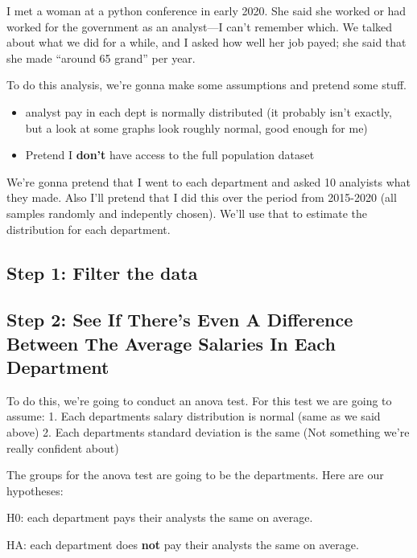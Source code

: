 \documentclass[letterpaper]{article}
\theoremstyle{definition}
\begin{document}
I met a woman at a python conference in early 2020. She said she worked
or had worked for the government as an analyst---I can't remember which.
We talked about what we did for a while, and I asked how well her job
payed; she said that she made ``around 65 grand'' per year.

To do this analysis, we're gonna make some assumptions and pretend some
stuff.

\begin{itemize}
\item
  analyst pay in each dept is normally distributed (it probably isn't
  exactly, but a look at some graphs look roughly normal, good enough
  for me)
\item
  Pretend I \textbf{don't} have access to the full population dataset
\end{itemize}

We're gonna pretend that I went to each department and asked 10
analyists what they made. Also I'll pretend that I did this over the
period from 2015-2020 (all samples randomly and indepently chosen).
We'll use that to estimate the distribution for each department.

    \hypertarget{step-1-filter-the-data}{%
\subsection{Step 1: Filter the data}\label{step-1-filter-the-data}}

    

    \hypertarget{step-2-see-if-theres-even-a-difference-between-the-average-salaries-in-each-department}{%
\subsection{Step 2: See If There's Even A Difference Between The Average
Salaries In Each
Department}\label{step-2-see-if-theres-even-a-difference-between-the-average-salaries-in-each-department}}

To do this, we're going to conduct an anova test. For this test we are
going to assume: 1. Each departments salary distribution is normal (same
as we said above) 2. Each departments standard deviation is the same
(Not something we're really confident about)

The groups for the anova test are going to be the departments. Here are
our hypotheses:

H0: each department pays their analysts the same on average.

HA: each department does \textbf{not} pay their analysts the same on
average.
\end{document}
